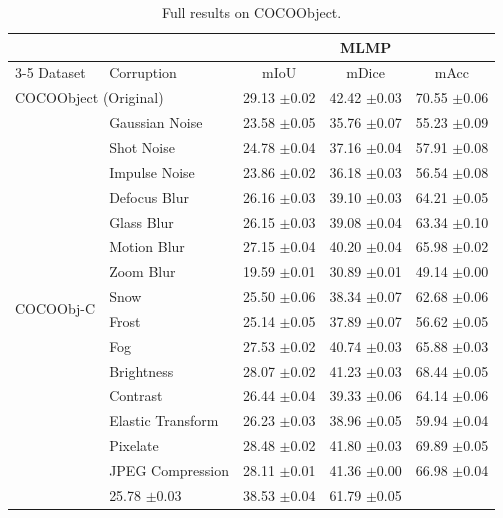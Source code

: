 \documentclass{article}
\begin{document}
\begin{table}[t]
\centering
\caption{Full results on COCOObject.}
\label{tab:results_cocoobj}
\begin{tabular}{ll|ccc}
\toprule
 & & \multicolumn{3}{c}{MLMP} \\
\cmidrule(lr){3-5}
Dataset & Corruption & mIoU & mDice & mAcc \\
\midrule
\multicolumn{2}{l}{COCOObject (Original)} & 29.13 {\scriptsize $\pm$0.02} & 42.42 {\scriptsize $\pm$0.03} & 70.55 {\scriptsize $\pm$0.06} \\
\multirow{16}{*}{COCOObj-C} & Gaussian Noise & 23.58 {\scriptsize $\pm$0.05} & 35.76 {\scriptsize $\pm$0.07} & 55.23 {\scriptsize $\pm$0.09} \\
 & Shot Noise & 24.78 {\scriptsize $\pm$0.04} & 37.16 {\scriptsize $\pm$0.04} & 57.91 {\scriptsize $\pm$0.08} \\
 & Impulse Noise & 23.86 {\scriptsize $\pm$0.02} & 36.18 {\scriptsize $\pm$0.03} & 56.54 {\scriptsize $\pm$0.08} \\
 & Defocus Blur & 26.16 {\scriptsize $\pm$0.03} & 39.10 {\scriptsize $\pm$0.03} & 64.21 {\scriptsize $\pm$0.05} \\
 & Glass Blur & 26.15 {\scriptsize $\pm$0.03} & 39.08 {\scriptsize $\pm$0.04} & 63.34 {\scriptsize $\pm$0.10} \\
 & Motion Blur & 27.15 {\scriptsize $\pm$0.04} & 40.20 {\scriptsize $\pm$0.04} & 65.98 {\scriptsize $\pm$0.02} \\
 & Zoom Blur & 19.59 {\scriptsize $\pm$0.01} & 30.89 {\scriptsize $\pm$0.01} & 49.14 {\scriptsize $\pm$0.00} \\
 & Snow & 25.50 {\scriptsize $\pm$0.06} & 38.34 {\scriptsize $\pm$0.07} & 62.68 {\scriptsize $\pm$0.06} \\
 & Frost & 25.14 {\scriptsize $\pm$0.05} & 37.89 {\scriptsize $\pm$0.07} & 56.62 {\scriptsize $\pm$0.05} \\
 & Fog & 27.53 {\scriptsize $\pm$0.02} & 40.74 {\scriptsize $\pm$0.03} & 65.88 {\scriptsize $\pm$0.03} \\
 & Brightness & 28.07 {\scriptsize $\pm$0.02} & 41.23 {\scriptsize $\pm$0.03} & 68.44 {\scriptsize $\pm$0.05} \\
 & Contrast & 26.44 {\scriptsize $\pm$0.04} & 39.33 {\scriptsize $\pm$0.06} & 64.14 {\scriptsize $\pm$0.06} \\
 & Elastic Transform & 26.23 {\scriptsize $\pm$0.03} & 38.96 {\scriptsize $\pm$0.05} & 59.94 {\scriptsize $\pm$0.04} \\
 & Pixelate & 28.48 {\scriptsize $\pm$0.02} & 41.80 {\scriptsize $\pm$0.03} & 69.89 {\scriptsize $\pm$0.05} \\
 & JPEG Compression & 28.11 {\scriptsize $\pm$0.01} & 41.36 {\scriptsize $\pm$0.00} & 66.98 {\scriptsize $\pm$0.04} \\
\cmidrule(l){2-5}
\multicolumn{2}{l}{\textit{COCOObject-C Average}} & 25.78 {\scriptsize $\pm$0.03} & 38.53 {\scriptsize $\pm$0.04} & 61.79 {\scriptsize $\pm$0.05} \\
\bottomrule
\end{tabular}
\end{table}
\end{document}
